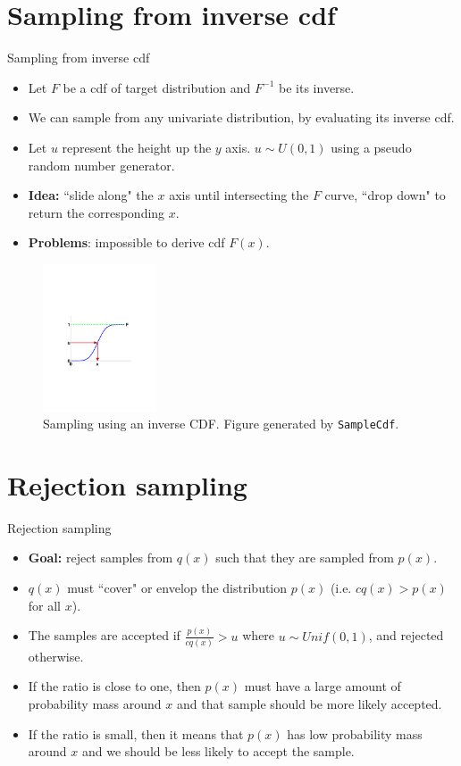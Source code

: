 \documentclass[10pt,mathserif]{beamer}
\begin{document}
\section{Sampling from inverse cdf}
\begin{frame}{Sampling from inverse cdf} 
\begin{itemize}
    \item Let $F$ be a cdf of target distribution and $F^{-1}$ be its inverse.
    \item We can sample from any univariate distribution, by evaluating its inverse cdf.
    \item Let $u$ represent the height up the $y$ axis. $u \sim U(0,1)$ using a pseudo random number generator.
    \item  \textbf{Idea:} ``slide along" the $x$ axis until intersecting the $F$ curve, ``drop down" to  return the corresponding $x$.
    \item  \textbf{Problems}: impossible to derive cdf $F(x)$.
\end{itemize}

\begin{figure}[h]
\centering
\includegraphics[width=0.3\textwidth]{sampleCdf}
\caption{Sampling using an inverse CDF. Figure generated by \texttt{SampleCdf}.}
\end{figure}    
\end{frame}

\section{Rejection sampling}
\begin{frame}{Rejection sampling}
\begin{itemize}
    \item \textbf{Goal:} reject samples from $q(x)$ such that they are sampled from $p(x)$.
    \item $q(x)$ must ``cover" or envelop the distribution $p(x)$ (i.e. $cq(x) > p(x)$ for all $x$).
    \item The samples are accepted if $\frac{p(x)}{cq(x)} > u $ where $u \sim Unif(0,1)$, and rejected otherwise.
    \item If the ratio is close to one, then $p(x)$ must have a large amount of probability mass around $x$ and that sample should be more likely accepted.
    \item If the ratio is small, then it means that $p(x)$ has low probability mass around $x$ and we should be less likely to accept the sample.
\end{itemize}    
\end{frame}
\end{document}
